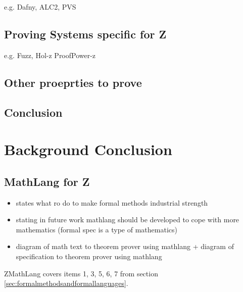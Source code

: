 e.g. Dafny, ALC2, PVS

\subsection{Proving Systems specific for Z}
\label{subsec:provingSystemsForZ}

e.g. Fuzz, Hol-z ProofPower-z

\subsection{Other proeprties to prove}
\label{subsec:propertiestoprove}

\subsection{Conclusion}

\section{Background Conclusion}

\subsection{MathLang for Z}

\begin{itemize}
\item \cite{fmpresetation} states what ro do to make formal methods industrial strength

\item \cite{lamarphd} stating in future work mathlang should be developed to cope with more mathematics (formal spec is a type of mathematics)

\item diagram of math text to theorem prover using mathlang + diagram of specification to theorem prover using mathlang
\end{itemize}

ZMathLang covers items 1, 3, 5, 6, 7 from section \ref{sec:formalmethodsandformallanguages}.